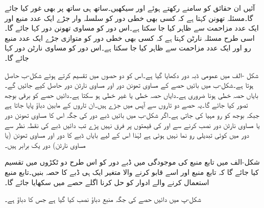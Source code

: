 آئیں ان حقائق کو سامنے رکھتے ہوئے  اور  سیکھیں۔ساتھ ہی ساتھ  پر بھی غور کیا جائے گا۔مسئلہ تھونن کہتا ہے کہ کسی بھی خطی دور کو سلسلہ وار جڑے ایک عدد منبع اور ایک عدد مزاحمت سے ظاہر کیا جا سکتا ہے۔اس دور کو مساوی تھونن دور کہا جائے گا۔اسی طرح مسئلہ نارٹن کہتا ہے کہ کسی بھی خطی دور کو متوازی جڑے ایک عدد منبع رو اور ایک عدد مزاحمت سے ظاہر  کیا جا سکتا ہے۔اس دور کو مساوی نارٹن دور کہا جائے گا۔

شکل -الف میں عمومی ڈبہ دور دکھایا گیا ہے۔اس کو دو حصوں میں تقسیم کرتے ہوئے شکل-ب حاصل ہوتا ہے۔شکل-ب میں بائیں حصے کے مساوی تھونن دور اور مساوی نارٹن دور حاصل کیے جائیں گے۔بایاں حصہ خطی ہونا ضروری ہے۔دایاں حصہ خطی یا غیر خطی ہو سکتا ہے۔دائیں حصے کو برقی بوجھ تصور کیا جائے گا۔یہ حصے دو تاروں سے آپس میں جڑے ہیں۔ان تاروں کے مابین  دباؤ پایا جاتا ہے جبکہ بوجھ کو رو  مہیا کی جاتی ہے۔اگر شکل-ب میں بائیں ڈبے دور کی جگہ اس کا مساوی تھونن دور یا مساوی نارٹن دور نصب کرنے سے  اور  کی قیمتوں پر فرق نہیں پڑے تب دائیں ڈبے کی نقطہ نظر سے دور میں کوئی تبدیلی رو نما نہیں ہوئی ہے لہٰذا اس کے لیے بایاں ڈبے کا دور اور مساوی تھونن (یا مساوی نارٹن) دور یک برابر ہیں۔

شکل-الف میں تابع منبع کی موجودگی میں ڈبے دور کو اس طرح دو ٹکڑوں میں تقسیم کیا جائے گا کہ تابع منبع اور اسے قابو کرنے والا متغیر ایک ہی ڈبے کا حصہ بنیں۔تابع منبع استعمال کرنے والے ادوار کو حل کرنا اگلے حصے میں سکھایا جائے گا۔

شکل-پ میں دائیں حصے کی جگہ  منبع دباؤ نصب کیا گیا ہے جس کا دباؤ  ہے۔ 

